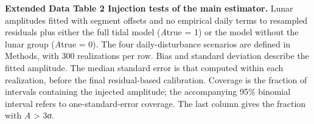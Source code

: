 \documentclass[
  11pt,
  a4paper,
]{article}
\begin{document}
\clearpage

\par\noindent\begin{minipage}[t]{\linewidth}\vspace{0pt}\singlespacing\small\nolinenumbers

\textbf{Extended Data Table 2 \textbar{} Injection tests of the main
estimator.} Lunar amplitudes fitted with segment offsets and no
empirical daily terms to resampled residuals plus either the full tidal
model (\emph{A}true = 1) or the model without the lunar group
(\emph{A}true = 0). The four daily-disturbance scenarios are defined in
Methods, with 300 realizations per row. Bias and standard deviation
describe the fitted amplitude. The median standard error is that
computed within each realization, before the final residual-based
calibration. Coverage is the fraction of intervals containing the
injected amplitude; the accompanying 95\% binomial interval refers to
one-standard-error coverage. The last column gives the fraction with
\emph{A} \textgreater{} 3σ.


\end{minipage}
\end{document}
